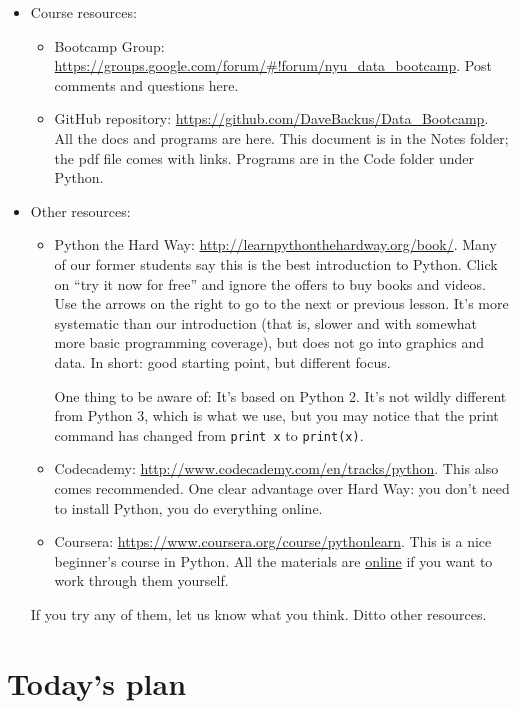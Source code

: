 \documentclass[11pt]{article}
\begin{document}
\begin{itemize}
\item Course resources:
\begin{itemize}
\item Bootcamp Group:  \url{https://groups.google.com/forum/#!forum/nyu_data_bootcamp}.
Post comments and questions here.

\item GitHub repository:  \url{https://github.com/DaveBackus/Data_Bootcamp}.
All the docs and programs are here.
This document is in the Notes folder;
the pdf file comes with links.
Programs are in the Code folder under Python.
\end{itemize}

\item Other resources:
%
\begin{itemize}
\item {Python the Hard Way}:  \url{http://learnpythonthehardway.org/book/}.
Many of our former students say this is the best introduction to Python.
Click on ``try it now for free'' and ignore the offers to buy books and videos.
Use the arrows on the right to go to the next or previous lesson.
It's more systematic than our introduction
(that is, slower and with somewhat more basic programming coverage),
but does not go into graphics and data.
In short:  good starting point, but different focus.

One thing to be aware of:  It's based on Python 2.
It's not wildly different from Python 3, which is what we use,
but you may notice that the print command has changed from {\tt print x} to {\tt print(x)}.

\item Codecademy:  \url{http://www.codecademy.com/en/tracks/python}.
This also comes recommended.
One clear advantage over Hard Way:  you don't need to install Python,
you do everything online.

\item Coursera:  \url{https://www.coursera.org/course/pythonlearn}.
This is a nice beginner's course in Python.
All the materials are
\href{http://open.umich.edu/education/si/coursera-programming-everybody/winter2014}{online}
if you want to work through them yourself.
\end{itemize}
If you try any of them, let us know what you think.  Ditto other resources.
\end{itemize}


\section{Today's plan}
\end{document}
